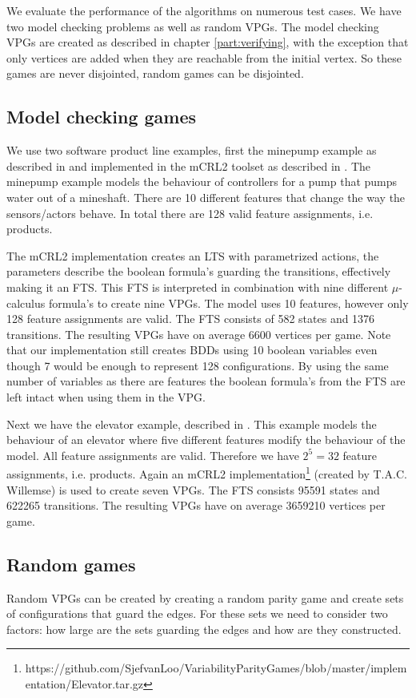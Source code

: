 We evaluate the performance of the algorithms on numerous test cases. We have two model checking problems as well as random VPGs. The model checking VPGs are created as described in chapter \ref{part:verifying}, with the exception that only vertices are added when they are reachable from the initial vertex. So these games are never disjointed, random games can be disjointed.

\subsection{Model checking games}
We use two software product line examples, first the minepump example as described in \cite{Kramer1983CONICAI} and implemented in the mCRL2 toolset as described in \cite{FamBasedModelCheckingWithMCRL2}. The minepump example models the behaviour of controllers for a pump that pumps water out of a mineshaft. There are 10 different features that change the way the sensors/actors behave. In total there are 128 valid feature assignments, i.e. products. 

The mCRL2 implementation creates an LTS with parametrized actions, the parameters describe the boolean formula's guarding the transitions, effectively making it an FTS. This FTS is interpreted in combination with nine different $\mu$-calculus formula's to create nine VPGs. The model uses 10 features, however only 128 feature assignments are valid. The FTS consists of 582 states and 1376 transitions. The resulting VPGs have on average 6600 vertices per game. Note that our implementation still creates BDDs using 10 boolean variables even though 7 would be enough to represent 128 configurations. By using the same number of variables as there are features the boolean formula's from the FTS are left intact when using them in the VPG.

Next we have the elevator example, described in \cite{PLATH200153}. This example models the behaviour of an elevator where five different features modify the behaviour of the model. All feature assignments are valid. Therefore we have $2^5 = 32$ feature assignments, i.e. products. Again an mCRL2 implementation\footnote{\label{note1}https://github.com/SjefvanLoo/VariabilityParityGames/blob/master/implementation/Elevator.tar.gz} (created by T.A.C. Willemse) is used to create seven VPGs. The FTS consists 95591 states and 622265 transitions. The resulting VPGs have on average 3659210 vertices per game. 
\subsection{Random games}
Random VPGs can be created by creating a random parity game and create sets of configurations that guard the edges. For these sets we need to consider two factors: how large are the sets guarding the edges and how are they constructed.

